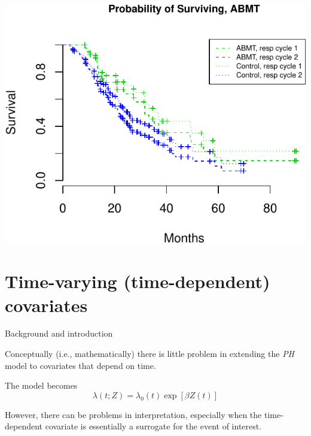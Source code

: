 \documentclass[ignorenonframetext,]{beamer}
\begin{document}
\begin{frame}

\scriptsize

\includegraphics{unit_04_ph_reg_basics_files/figure-beamer/unnamed-chunk-18-1.pdf}

\end{frame}

\hypertarget{time-varying-time-dependent-covariates}{%
\section{Time-varying (time-dependent)
covariates}\label{time-varying-time-dependent-covariates}}

\begin{frame}{%
\protect\hypertarget{background-and-introduction}{%
Background and introduction}}

Conceptually (i.e., mathematically) there is little problem in extending
the \emph{PH} model to covariates that depend on time.

The model becomes \[
        \lambda(t;Z) = \lambda_0(t) \exp[\beta Z(t)]
\]

However, there can be problems in interpretation, especially when the
time-dependent covariate is essentially a surrogate for the event of
interest.

\end{frame}
\end{document}

